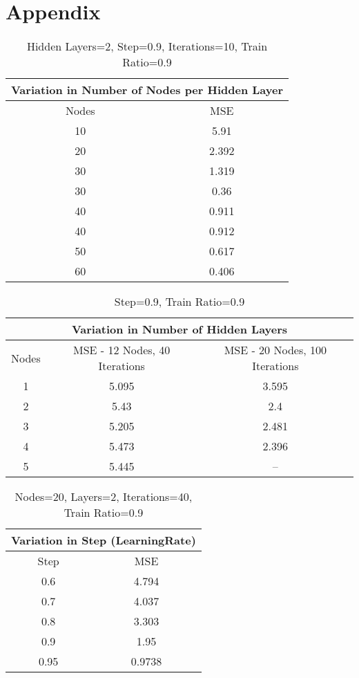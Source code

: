 \documentclass[a4paper,11pt]{article}
\begin{document}
\section{Appendix}
\begin{table}[h]
\centering
\begin{tabular}{|c|c|}
\hline
\multicolumn{2}{|c|}{Variation in Number of Nodes per Hidden Layer }\\
\hline
Nodes & MSE\\ 
\hline
10 & 5.91\\ 
\hline
20 & 2.392\\ 
\hline
30 & 1.319\\ 
\hline
30 & 0.36\\ 
\hline
40 & 0.911\\ 
\hline
40 & 0.912\\ 
\hline
50 & 0.617\\ 
\hline
60 & 0.406\\ 
\hline
\hline\end{tabular}
\label{table:table}
\caption{\small{Hidden Layers=2, Step=0.9, Iterations=10, Train Ratio=0.9 }} 
\end{table}


\begin{table}[h]
\centering
\begin{tabular}{|c|c|c|}
\hline
\multicolumn{3}{|c|}{Variation in Number of Hidden Layers}\\ 
\hline
Nodes & MSE - 12 Nodes, 40 Iterations & MSE - 20 Nodes, 100 Iterations\\ 
\hline
1 & 5.095 & 3.595\\ 
\hline
2 & 5.43 & 2.4\\ 
\hline
3 & 5.205 & 2.481\\ 
\hline
4 & 5.473 & 2.396\\ 
\hline
5 & 5.445 & --\\ 
\hline
\hline\end{tabular}
\label{table:table}
\caption{\small{Step=0.9, Train Ratio=0.9 }} 
\end{table}


\begin{table}[h]
\centering
\begin{tabular}{|c|c|}
\hline
\multicolumn{2}{|c|}{Variation in Step (LearningRate)}\\ 
\hline
Step & MSE\\ 
\hline
0.6 & 4.794\\ 
\hline
0.7 & 4.037\\ 
\hline
0.8 & 3.303\\ 
\hline
0.9 & 1.95\\ 
\hline
0.95 & 0.9738\\ 
\hline
\hline\end{tabular}
\label{table:table}
\caption{\small{Nodes=20, Layers=2, Iterations=40, Train Ratio=0.9 }} 
\end{table}
\end{document}
